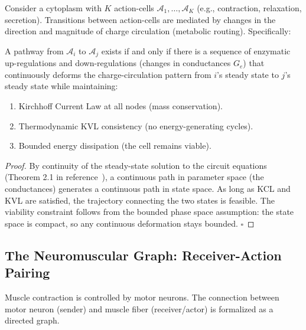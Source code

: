 \begin{theorem}
\label{thm:action-cell-routing}
Consider a cytoplasm with $K$ action-cells $\mathcal{A}_1, \ldots, \mathcal{A}_K$ (e.g., contraction, relaxation, secretion). Transitions between action-cells are mediated by changes in the direction and magnitude of charge circulation (metabolic routing). Specifically:

A pathway from $\mathcal{A}_i$ to $\mathcal{A}_j$ exists if and only if there is a sequence of enzymatic up-regulations and down-regulations (changes in conductances $G_e$) that continuously deforms the charge-circulation pattern from $i$'s steady state to $j$'s steady state while maintaining:
\begin{enumerate}[label=(\roman*), noitemsep]
\item Kirchhoff Current Law at all nodes (mass conservation).
\item Thermodynamic KVL consistency (no energy-generating cycles).
\item Bounded energy dissipation (the cell remains viable).
\end{enumerate}
\end{theorem}

\begin{proof}
By continuity of the steady-state solution to the circuit equations (Theorem 2.1 in reference~\cite{BohachevskySahni1974}), a continuous path in parameter space (the conductances) generates a continuous path in state space. As long as KCL and KVL are satisfied, the trajectory connecting the two states is feasible. The viability constraint follows from the bounded phase space assumption: the state space is compact, so any continuous deformation stays bounded. $\square$
\end{proof}

\subsection{The Neuromuscular Graph: Receiver-Action Pairing}
\label{subsec:neuromuscular-graph}

Muscle contraction is controlled by motor neurons. The connection between motor neuron (sender) and muscle fiber (receiver/actor) is formalized as a directed graph.

